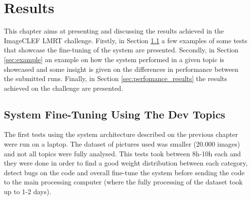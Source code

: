 \cleardoublepage
\chapter{Results}
\label{ch:results}

This chapter aims at presenting and discussing the results achieved in the ImageCLEF LMRT challenge. Firstly, in Section \ref{sec:first} a few examples of some tests that showcase the fine-tuning of the system are presented. Secondly, in Section \ref{sec:example} an example on how the system performed in a given topic is showcased and some insight is given on the differences in performance between the submitted runs. Finally, in Section \ref{sec:perfomance_results} the results achieved on the challenge are presented.

\section{System Fine-Tuning Using The Dev Topics}
\label{sec:first}

The first tests using the system architecture described on the previous chapter were run on a laptop. The dataset of pictures used was smaller (20.000 images) and not all topics were fully analysed. This tests took between 8h-10h each and they were done in order to find a good weight distribution between each category, detect bugs on the code and overall fine-tune the system before sending the code to the main processing computer (where the fully processing of the dataset took up to 1-2 days).


